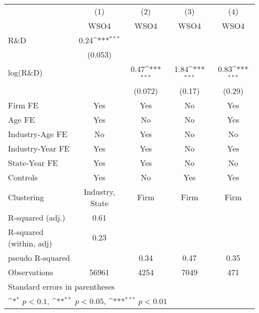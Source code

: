 {
\def\sym#1{\ifmmode^{#1}\else\(^{#1}\)\fi}
\begin{tabular}{l*{4}{c}}
\toprule
                    &\multicolumn{1}{c}{(1)}&\multicolumn{1}{c}{(2)}&\multicolumn{1}{c}{(3)}&\multicolumn{1}{c}{(4)}\\
                    &\multicolumn{1}{c}{WSO4}&\multicolumn{1}{c}{WSO4}&\multicolumn{1}{c}{WSO4}&\multicolumn{1}{c}{WSO4}\\
\midrule
R\&D                &        0.24\sym{***}&                     &                     &                     \\
                    &     (0.053)         &                     &                     &                     \\
\addlinespace
log(R\&D)           &                     &        0.47\sym{***}&        1.84\sym{***}&        0.83\sym{***}\\
                    &                     &     (0.072)         &      (0.17)         &      (0.29)         \\
\addlinespace
Firm FE             &         Yes         &         Yes         &          No         &         Yes         \\
\addlinespace
Age FE              &         Yes         &          No         &          No         &         Yes         \\
\addlinespace
Industry-Age FE     &          No         &         Yes         &          No         &          No         \\
\addlinespace
Industry-Year FE    &         Yes         &         Yes         &          No         &         Yes         \\
\addlinespace
State-Year FE       &         Yes         &         Yes         &          No         &          No         \\
\addlinespace
Controls & Yes & No & Yes & Yes \\
\addlinespace
\midrule
Clustering          & Industry, State         &       Firm         &       Firm         &       Firm         \\
R-squared (adj.)    &        0.61         &                     &                     &                     \\
R-squared (within, adj)&        0.23         &                     &                     &                     \\
pseudo R-squared    &                     &        0.34         &        0.47         &        0.35         \\
Observations        &       56961         &        4254         &        7049         &         471         \\
\bottomrule
\multicolumn{5}{l}{\footnotesize Standard errors in parentheses}\\
\multicolumn{5}{l}{\footnotesize \sym{*} \(p<0.1\), \sym{**} \(p<0.05\), \sym{***} \(p<0.01\)}\\
\end{tabular}
}
